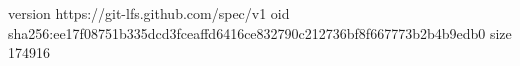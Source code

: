 version https://git-lfs.github.com/spec/v1
oid sha256:ee17f08751b335dcd3fceaffd6416ce832790c212736bf8f667773b2b4b9edb0
size 174916
